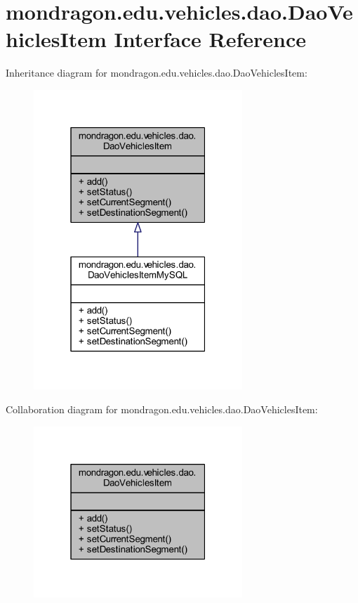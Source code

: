 \hypertarget{interfacemondragon_1_1edu_1_1vehicles_1_1dao_1_1_dao_vehicles_item}{}\section{mondragon.\+edu.\+vehicles.\+dao.\+Dao\+Vehicles\+Item Interface Reference}
\label{interfacemondragon_1_1edu_1_1vehicles_1_1dao_1_1_dao_vehicles_item}


Inheritance diagram for mondragon.\+edu.\+vehicles.\+dao.\+Dao\+Vehicles\+Item\+:\nopagebreak
\begin{figure}[H]
\begin{center}
\leavevmode
\includegraphics[width=223pt]{interfacemondragon_1_1edu_1_1vehicles_1_1dao_1_1_dao_vehicles_item__inherit__graph}
\end{center}
\end{figure}


Collaboration diagram for mondragon.\+edu.\+vehicles.\+dao.\+Dao\+Vehicles\+Item\+:\nopagebreak
\begin{figure}[H]
\begin{center}
\leavevmode
\includegraphics[width=223pt]{interfacemondragon_1_1edu_1_1vehicles_1_1dao_1_1_dao_vehicles_item__coll__graph}
\end{center}
\end{figure}
